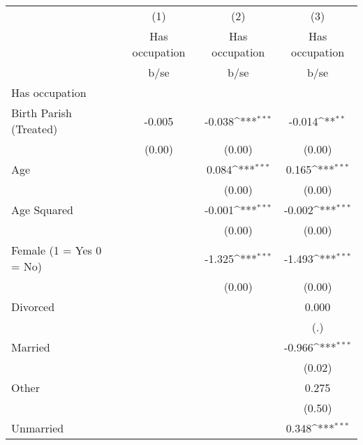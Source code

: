 {
\def\sym#1{\ifmmode^{#1}\else\(^{#1}\)\fi}
\begin{tabular}{l*{3}{c}}
\hline\hline
                    &\multicolumn{1}{c}{(1)}&\multicolumn{1}{c}{(2)}&\multicolumn{1}{c}{(3)}\\
                    &\multicolumn{1}{c}{Has occupation}&\multicolumn{1}{c}{Has occupation}&\multicolumn{1}{c}{Has occupation}\\
                    &        b/se         &        b/se         &        b/se         \\
\hline
Has occupation      &                     &                     &                     \\
Birth Parish (Treated)&      -0.005         &      -0.038\sym{***}&      -0.014\sym{**} \\
                    &      (0.00)         &      (0.00)         &      (0.00)         \\
Age                 &                     &       0.084\sym{***}&       0.165\sym{***}\\
                    &                     &      (0.00)         &      (0.00)         \\
Age Squared         &                     &      -0.001\sym{***}&      -0.002\sym{***}\\
                    &                     &      (0.00)         &      (0.00)         \\
Female (1 = Yes 0 = No)&                     &      -1.325\sym{***}&      -1.493\sym{***}\\
                    &                     &      (0.00)         &      (0.00)         \\
Divorced            &                     &                     &       0.000         \\
                    &                     &                     &         (.)         \\
Married             &                     &                     &      -0.966\sym{***}\\
                    &                     &                     &      (0.02)         \\
Other               &                     &                     &       0.275         \\
                    &                     &                     &      (0.50)         \\
Unmarried           &                     &                     &       0.348\sym{***}\\

\end{tabular}}
